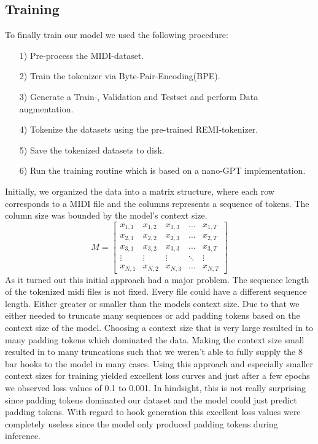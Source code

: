 \documentclass[a4paper,12pt]{extarticle}
\begin{document}
\subsection{Training}
    \label{sec:Training}
To finally train our model we used the following procedure:
    \begin{itemize}
        \item[1)] Pre-process the MIDI-dataset.
        \item[2)] Train the tokenizer via Byte-Pair-Encoding(BPE).
        \item[3)] Generate a Train-, Validation and Testset and perform Data augmentation.
        \item[4)] Tokenize the datasets using the pre-trained REMI-tokenizer.
        \item[5)] Save the tokenized datasets to disk.
        \item[6)] Run the training routine which is based on a nano-GPT implementation.
    \end{itemize}
Initially, we organized the data into a matrix structure, where each row corresponds to a MIDI file and the columns represents a sequence of tokens. The column size was bounded by the model's context size.
\[
M =
\begin{bmatrix}
    x_{1,1} & x_{1,2} & x_{1,3} & \dots & x_{1,T} \\
    x_{2,1} & x_{2,2} & x_{2,3} & \dots & x_{2,T} \\
    x_{3,1} & x_{3,2} & x_{3,3} & \dots & x_{3,T} \\
    \vdots  & \vdots  & \vdots  & \ddots & \vdots  \\
    x_{N,1} & x_{N,2} & x_{N,3} & \dots & x_{N,T}
\end{bmatrix}
\]
As it turned out this initial approach had a major problem.
The sequence length of the tokenized midi files is not fixed. Every file could have a different sequence length. Either greater or smaller than the models context size. Due to that we either needed to truncate many sequences or add padding tokens based on the context size of the model. Choosing a context size that is very large resulted in to many padding tokens which dominated the data. Making the context size small resulted in to many truncations such that we weren't able to fully supply the 8 bar hooks to the model in many cases. Using this approach and especially smaller context sizes for training yielded excellent loss curves and just after a few epochs we observed loss values of 0.1 to 0.001. In hindsight, this is not really surprising since padding tokens dominated our dataset and the model could just predict padding tokens.
With regard to hook generation this  excellent loss values were completely useless since the model only produced padding tokens during inference.
\end{document}
